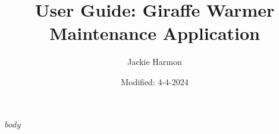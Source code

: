 \documentclass{article}
\title{User Guide: Giraffe Warmer Maintenance Application}
\author{Jackie Harmon}
\date{Modified: 4-4-2024}
\begin{document}
\maketitle
\newpage

\tableofcontents
\newpage

$body$
\end{document}
